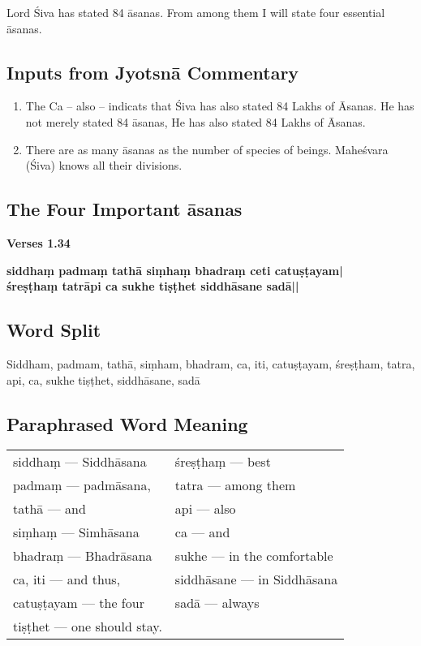 Lord Śiva has stated 84 āsanas. From among them I will state four essential āsanas.

\subsection*{Inputs from Jyotsnā Commentary}

\begin{enumerate}
\item The Ca – also – indicats that Śiva has also stated 84 Lakhs of Āsanas. He has not merely stated 84 āsanas, He has also stated 84 Lakhs of Āsanas. 
\item There are as many āsanas as the number of species of beings. Maheśvara (Śiva) knows all their divisions. 
\end{enumerate}

\subsection*{The Four Important āsanas}

\noindent 
\textbf{Verses 1.34}

\begin{shloka}
\textbf{siddhaṃ padmaṃ tathā siṃhaṃ bhadraṃ ceti catuṣṭayam|}\\
\textbf{śreṣṭhaṃ tatrāpi ca sukhe tiṣṭhet siddhāsane sadā||}
\end{shloka}

\subsection*{Word Split}

Siddham, padmam, tathā, siṃham, bhadram, ca, iti, catuṣṭayam, śreṣṭham, tatra, api, ca, sukhe tiṣṭhet, siddhāsane, sadā

\subsection*{Paraphrased Word Meaning}

\begin{longtable}{>{\noindent\raggedright}p{5cm}>{\noindent\raggedright}p{5cm}}
siddhaṃ --- Siddhāsana & śreṣṭhaṃ --- best\tabularnewline
padmaṃ --- padmāsana,  & tatra --- among them\tabularnewline
tathā --- and & api --- also\tabularnewline
siṃhaṃ --- Simhāsana & ca --- and\tabularnewline
bhadraṃ --- Bhadrāsana & sukhe --- in the comfortable\tabularnewline
ca, iti --- and thus,  & siddhāsane --- in Siddhāsana\tabularnewline
catuṣṭayam --- the four & sadā --- always\tabularnewline
tiṣṭhet --- one should stay. &
\end{longtable}

